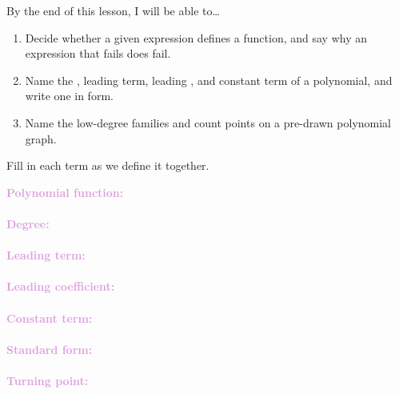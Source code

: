 \documentclass[10pt]{article}
\begin{document}

\vspace{0.12in}

\begin{objectivebox}
By the end of this lesson, I will be able to\ldots
\begin{enumerate}[itemsep=2pt]
  \item Decide whether a given expression defines a  function, and
        say why an expression that fails does fail.
  \item Name the , leading term, leading , and constant
        term of a polynomial, and write one in  form.
  \item Name the low-degree families and count  points on a
        pre-drawn polynomial graph.
\end{enumerate}
\end{objectivebox}

\vspace{0.1in}

\boxguard
\begin{vocabbox}
Fill in each term as we define it together.
\par\vspace{2pt}
\noindent\textbf{\textcolor{plum}{Polynomial function:}}\\[1pt]
\\[3pt]
\noindent\textbf{\textcolor{plum}{Degree:}}\\[1pt]
\\[3pt]
\noindent\textbf{\textcolor{plum}{Leading term:}}\\[1pt]
\\[3pt]
\noindent\textbf{\textcolor{plum}{Leading coefficient:}}\\[1pt]
\\[3pt]
\noindent\textbf{\textcolor{plum}{Constant term:}}\\[1pt]
\\[3pt]
\noindent\textbf{\textcolor{plum}{Standard form:}}\\[1pt]
\\[3pt]
\noindent\textbf{\textcolor{plum}{Turning point:}}\\[1pt]
\end{vocabbox}
\end{document}
